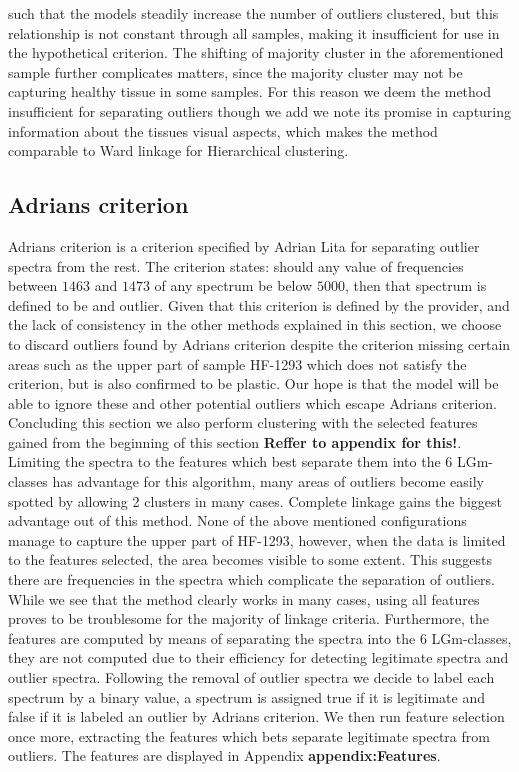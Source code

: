 such that the models steadily increase the number of outliers clustered, but this relationship is not constant through all samples, making it insufficient for use in the hypothetical criterion. The shifting of majority cluster in the aforementioned sample further complicates matters, since the majority cluster may not be capturing healthy tissue in some samples. For this reason we deem the method insufficient for separating outliers though we add we note its promise in capturing information about the tissues visual aspects, which makes the method comparable to Ward linkage for Hierarchical clustering. 

\subsection{Adrians criterion}

Adrians criterion is a criterion specified by Adrian Lita for separating outlier spectra from the rest. The criterion states: should any value of frequencies between $1463$ and $1473$ of any spectrum be below $5000$, then that spectrum is defined to be and outlier. Given that this criterion is defined by the provider, and the lack of consistency in the other methods explained in this section, we choose to discard outliers found by Adrians criterion despite the criterion missing certain areas such as the upper part of sample HF-1293 which does not satisfy the criterion, but is also confirmed to be plastic. Our hope is that the model will be able to ignore these and other potential outliers which escape Adrians criterion.
\\

Concluding this section we also perform clustering with the selected features gained from the beginning of this section \textbf{Reffer to appendix for this!}. Limiting the spectra to the features which best separate them into the 6 LGm-classes has advantage for this algorithm, many areas of outliers become easily spotted by allowing 2 clusters in many cases. Complete linkage gains the biggest advantage out of this method. None of the above mentioned configurations manage to capture the upper part of HF-1293, however, when the data is limited to the features selected, the area becomes visible to some extent. This suggests there are frequencies in the spectra which complicate the separation of outliers. While we see that the method clearly works in many cases, using all features proves to be troublesome for the majority of linkage criteria. Furthermore, the features are computed by means of separating the spectra into the 6 LGm-classes, they are not computed due to their efficiency for detecting legitimate spectra and outlier spectra. Following the removal of outlier spectra we decide to label each spectrum by a binary value, a spectrum is assigned true if it is legitimate and false if it is labeled an outlier by Adrians criterion. We then run feature selection once more, extracting the features which bets separate legitimate spectra from outliers. The features are displayed in Appendix \textbf{appendix:Features}.